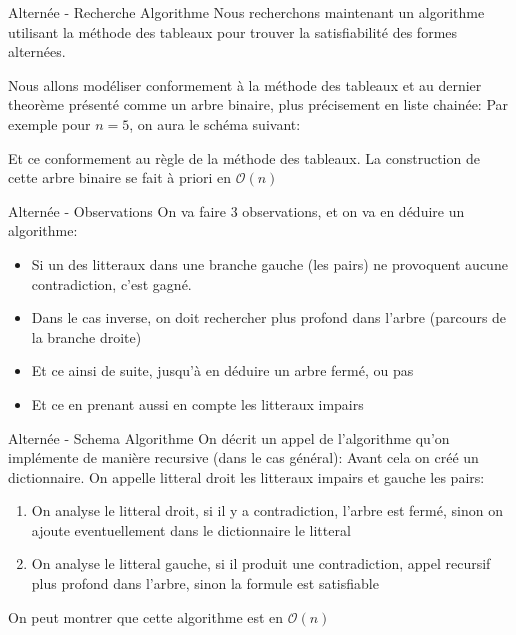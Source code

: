 \documentclass[]{beamer}
\begin{document}
\begin{frame}{Alternée - Recherche Algorithme}
    Nous recherchons maintenant un algorithme utilisant la méthode des tableaux pour trouver la satisfiabilité des formes alternées.

    Nous allons modéliser conformement à la méthode des tableaux et au dernier theorème présenté comme un arbre binaire, plus précisement en liste chainée:
    Par exemple pour $n=5$, on aura le schéma suivant:
    
    \pause
    
    \pause
    Et ce conformement au règle de la méthode des tableaux.
    La construction de cette arbre binaire se fait à priori en $\mathcal{O}(n)$
\end{frame}

\begin{frame}{Alternée - Observations}
    On va faire 3 observations, et on va en déduire un algorithme:
    \begin{itemize}
        \item Si un des litteraux dans une branche gauche (les pairs) ne provoquent aucune contradiction, c'est gagné.
        \item Dans le cas inverse, on doit rechercher plus profond dans l'arbre (parcours de la branche droite)
        \item Et ce ainsi de suite, jusqu'à en déduire un arbre fermé, ou pas
        \item Et ce en prenant aussi en compte les litteraux impairs
    \end{itemize}

\end{frame}

\begin{frame}{Alternée - Schema Algorithme}
    On décrit un appel de l'algorithme qu'on implémente de manière recursive (dans le cas général):
    Avant cela on créé un dictionnaire. 
    On appelle litteral droit les litteraux impairs et gauche les pairs:  
    \begin{enumerate}
        \item On analyse le litteral droit, si il y a contradiction, l'arbre est fermé, sinon on ajoute eventuellement dans le dictionnaire le litteral
        \item On analyse le litteral gauche, si il produit une contradiction, appel recursif plus profond dans l'arbre, sinon la formule est satisfiable
    \end{enumerate}
    On peut montrer que cette algorithme est en $\mathcal{O}(n)$
\end{frame}
\end{document}
